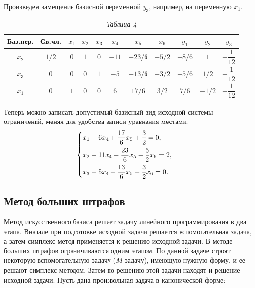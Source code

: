 Произведем замещение базисной переменной $y_{3}$, например, на переменную $x_{1}$.

\begin{table}[h]
\caption*{\hspace{0.8\linewidth} \textit{Таблица 4}}
\begin{center}
\renewcommand{\tabcolsep}{4,9pt}
\begin{tabular}{ | c | c | c | c | c | c | c | c | c | c | c | }
\hline
Баз.пер. & Св.чл. & $x_{1}$ & $x_{2}$ & $x_{3}$ & $x_{4}$ & $x_{5}$ & $x_{6}$ & $y_{1}$ & $y_{2}$ & $y_{3}$ \\ \hline
\rule{0cm}{5,5mm}$x_{2}$ & $1/2$ & $0$ & $1$ & $0$ & $-11$ & $-23/6$ & $-5/2$ & $-8/6$ & $1$ & $-\dfrac{1}{12}$ \\ \hline
\rule{0cm}{5,5mm}$x_{3}$ & $0$ & $0$ & $0$ & $1$ & $-5$ & $-13/6$ & $-3/2$ & $-5/6$ & $1/2$ & $-\dfrac{1}{12}$ \\ \hline
\rule{0cm}{5,5mm}$x_{1}$ & $0$ & $1$ & $0$ & $0$ & $6$ & $17/6$ & $3/2$ & $7/6$ & $-1/2$ & $-\dfrac{1}{12}$\\ \hline
\end{tabular}
\end{center}
\end{table}

Теперь можно записать допустимый базисный вид исходной системы ограничений, меняя для удобства записи уравнения местами.\\

$$\begin{cases}\vspace{5pt}
x_{1}+6x_{4}+\dfrac{17}{6}x_{5}+\dfrac{3}{2}=0,\\ \vspace{5pt}
x_{2}-11x_{4}-\dfrac{23}{6}x_{5}-\dfrac{5}{2}x_{6}=2,\\
x_{3}-5x_{4}-\dfrac{13}{6}x_{5}-\dfrac{3}{2}x_{6} =0.
\end{cases}$$

\subsection{Метод больших штрафов}
Метод искусственного базиса решает задачу линейного программирования в два этапа. Вначале при подготовке исходной задачи решается вспомогательная задача, а затем симплекс-метод применяется к решению исходной задачи. В методе больших штрафов ограничиваются одним этапом. По данной задаче строят некоторую вспомогательную задачу ($M$-задачу), имеющую нужную форму, и ее  решают симплекс-методом. Затем по решению этой задачи  находят  и  решение исходной задачи. Пусть дана произвольная задача в канонической форме:

